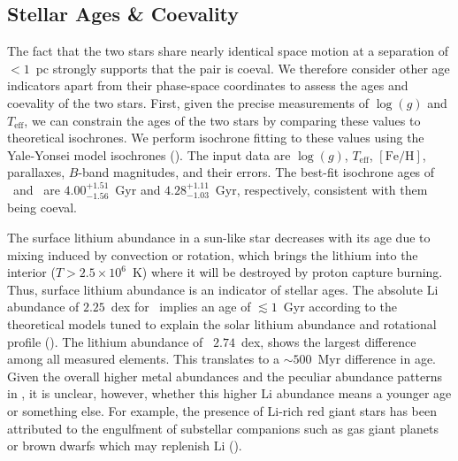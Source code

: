 \documentclass[modern, letterpaper]{aastex61}
\newcommand*\elem[1]{\ensuremath{\mathrm{#1}}}
\newcommand*\elemH[1]{\ensuremath{[\mathrm{#1}/\elem{H}]}}
\newcommand*{\feh}{\ensuremath{\elemH{Fe}}}
\newcommand{\sunanalog}{\text{Krios}}
\newcommand{\bizarreone}{\text{Kronos}}
\begin{document}
\subsection{Stellar Ages \& Coevality}
\label{sub:ages}

The fact that the two stars share nearly identical space motion
at a separation of $< 1$~pc strongly supports that the pair is coeval.
We therefore consider other age indicators apart from their phase-space
coordinates to assess the ages and coevality of the two stars.
First, given the precise measurements of $\log(g)$ and $T_\mathrm{eff}$,
we can constrain the ages of the two stars by
comparing these values to theoretical isochrones.
We perform isochrone fitting to these values using the Yale-Yonsei model
isochrones (\citealt{2013ApJ...776...87S}).
The input data are $\log(g)$, $T_\mathrm{eff}$, \feh,
parallaxes, $B$-band magnitudes, and their errors.
The best-fit isochrone ages of \sunanalog\ and \bizarreone\ are
$4.00_{-1.56}^{+1.51}$~Gyr and $4.28_{-1.03}^{+1.11}$~Gyr, respectively,
consistent with them being coeval.

The surface lithium abundance in a sun-like star decreases with its age due to
mixing induced by convection or rotation, which brings the lithium into the
interior ($T>2.5 \times 10^{6}$~K) where it will be destroyed by proton capture
burning.
Thus, surface lithium abundance is an indicator of stellar ages.
The absolute $\elem{Li}$ abundance of $2.25$~dex for \sunanalog\ implies an age
of $\lesssim 1$~Gyr according to the theoretical models tuned to explain the
solar lithium abundance and rotational profile (\citealt{2005Sci...309.2189C}).
The lithium abundance of \bizarreone\, $2.74$~dex, shows the largest difference
among all measured elements.
This translates to a $\sim 500$~Myr difference in age.
Given the overall higher metal abundances and the peculiar abundance patterns
in \bizarreone, it is unclear, however, whether this higher $\elem{Li}$
abundance means a younger age or something else.
For example, the presence of $\elem{Li}$-rich red giant stars has been
attributed to the engulfment of substellar companions such as gas giant planets
or brown dwarfs which may replenish $\elem{Li}$ (\citealt{Casey:2016aa}).
\end{document}

